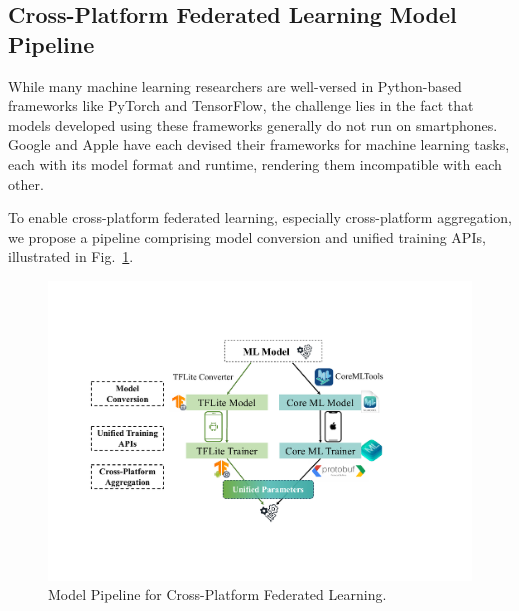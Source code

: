 \subsection{Cross-Platform Federated Learning Model Pipeline}
\label{sec:pipeline}

While many machine learning researchers are well-versed in Python-based
frameworks like PyTorch and TensorFlow,
the challenge lies in the fact that models developed using these frameworks
generally do not run on smartphones.
Google and Apple have each devised their frameworks for machine learning tasks,
each with its model format and runtime,
rendering them incompatible with each other.

To enable cross-platform federated learning,
especially cross-platform aggregation,
we propose a pipeline comprising model conversion and unified training APIs,
illustrated in Fig.~\ref{fig:pipeline}.

\begin{figure}\begin{center}
    \includegraphics[width=\linewidth]{model_pipeline.pdf}
    \caption{\fedkit Model Pipeline for Cross-Platform Federated Learning.}
    \label{fig:pipeline}
\end{center}\end{figure}

